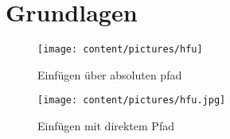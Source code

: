 \chapter{Grundlagen}
\begin{figure}
\caption{Einfügen über absoluten pfad}
\texttt{[image: content/pictures/hfu]}
\label{pic:bild3}
\end{figure}

\begin{figure}
	\centering
	    \texttt{[image: content/pictures/hfu.jpg]}
	\caption{Einfügen mit direktem Pfad}
	\label{La12bel}
\end{figure}